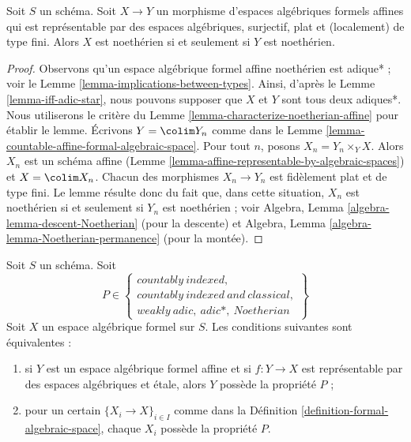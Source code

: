 \begin{lemma}
\label{lemma-iff-noetherian}
Soit $S$ un schéma. Soit $X \to Y$ un morphisme d'espaces algébriques
formels affines qui est représentable par des espaces algébriques,
surjectif, plat et (localement) de type fini. Alors $X$ est noethérien
si et seulement si $Y$ est noethérien.
\end{lemma}

\begin{proof}
Observons qu'un espace algébrique formel affine noethérien est adique* ; voir le
Lemme \ref{lemma-implications-between-types}. Ainsi, d'après le
Lemme \ref{lemma-iff-adic-star}, nous pouvons supposer que $X$ et $Y$
sont tous deux adiques*. Nous utiliserons le critère du
Lemme \ref{lemma-characterize-noetherian-affine}
pour établir le lemme. Écrivons $Y = \colim Y_n$
comme dans le Lemme \ref{lemma-countable-affine-formal-algebraic-space}.
Pour tout $n$, posons $X_n = Y_n \times_Y X$. Alors $X_n$ est un
schéma affine (Lemme \ref{lemma-affine-representable-by-algebraic-spaces})
et $X = \colim X_n$. Chacun des morphismes $X_n \to Y_n$ est
fidèlement plat et de type fini. Le lemme résulte donc du
fait que, dans cette situation, $X_n$ est noethérien si et seulement si $Y_n$
est noethérien ; voir
Algebra, Lemma \ref{algebra-lemma-descent-Noetherian} (pour la descente)
et
Algebra, Lemma \ref{algebra-lemma-Noetherian-permanence} (pour la montée).
\end{proof}

\begin{lemma}
\label{lemma-type-local}
Soit $S$ un schéma. Soit
$$
P \in
\left\{
\begin{matrix}
countably\ indexed,\\
countably\ indexed\ and\ classical,\\
weakly\ adic,\ adic*,\ Noetherian
\end{matrix}
\right\}
$$
Soit $X$ un espace algébrique formel sur $S$.
Les conditions suivantes sont équivalentes :
\begin{enumerate}
\item si $Y$ est un espace algébrique formel affine et si
$f : Y \to X$ est représentable par des espaces algébriques et étale,
alors $Y$ possède la propriété $P$ ;
\item pour un certain $\{X_i \to X\}_{i \in I}$ comme dans la
Définition \ref{definition-formal-algebraic-space},
chaque $X_i$ possède la propriété $P$.
\end{enumerate}
\end{lemma}

